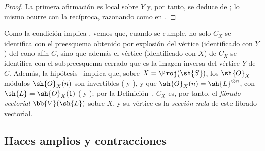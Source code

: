 \documentclass[oneside,10pt]{amsart}
\let\EGAOriginalLabel\label
\renewcommand{\label}[1]{\phantomsection\EGAOriginalLabel{#1}}
\begin{document}
\begin{proof}
La primera afirmación es local sobre $Y$ y, por tanto, se deduce de ;
lo mismo ocurre con la recíproca, razonando como en .
\end{proof}
\begin{remark}[8.7.8]
\label{II.8.7.8}
Como la condición  implica , vemos que, cuando se cumple, no solo $C_X$ se identifica con el preesquema obtenido por explosión del vértice (identificado con $Y$) del cono afín $C$, sino que además el vértice (identificado con $X$) de $C_X$ se identifica con el subpreesquema cerrado que es la imagen inversa del vértice $Y$ de $C$.
Además, la hipótesis~ implica que, sobre $X=\Proj(\sh{S})$, los $\sh{O}_X$-módulos $\sh{O}_X(n)$ son invertibles ( y ), y que $\sh{O}_X(n)=\sh{L}^{\otimes n}$, con $\sh{L}=\sh{O}_X(1)$ ( y );
por la Definición~, $C_X$ es, por tanto, el \emph{fibrado vectorial} $\bb{V}(\sh{L})$ sobre $X$, y su vértice es la \emph{sección nula} de este fibrado vectorial.
\end{remark}
\subsection{Haces amplios y contracciones}
\label{subsection:II.8.8}
\end{document}

